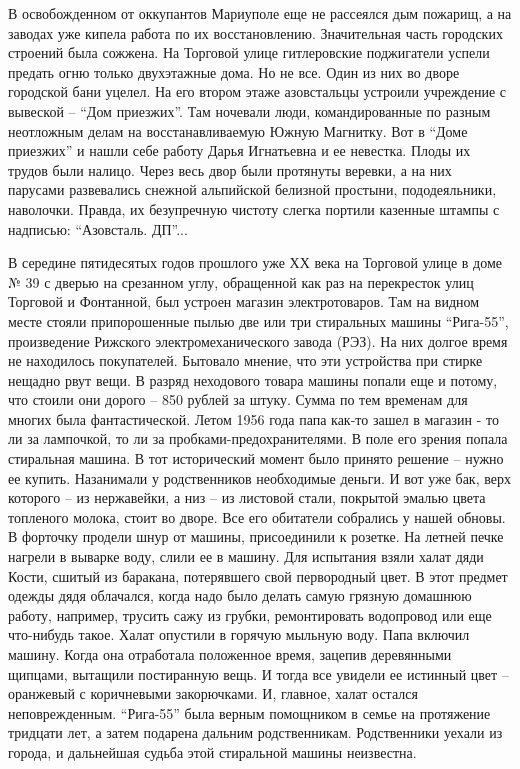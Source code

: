 В освобожденном от оккупантов Мариуполе еще не рассеялся дым пожарищ, а на
заводах уже кипела работа по их восстановлению. Значительная часть городских
строений была сожжена. На Торговой улице гитлеровские поджигатели успели
предать огню только двухэтажные дома. Но не все. Один из них во дворе городской
бани уцелел. На его втором этаже азовстальцы устроили учреждение с вывеской –
\enquote{Дом приезжих}. Там ночевали люди, командированные по разным неотложным делам
на восстанавливаемую Южную Магнитку. Вот в \enquote{Доме приезжих} и нашли себе работу
Дарья Игнатьевна и ее невестка. Плоды их трудов были налицо. Через весь двор
были протянуты веревки, а на них парусами развевались снежной альпийской
белизной простыни, пододеяльники, наволочки. Правда, их безупречную чистоту
слегка портили казенные штампы с надписью: \enquote{Азовсталь. ДП}...

В середине пятидесятых годов прошлого уже ХХ века на Торговой улице в доме № 39
с дверью на срезанном углу, обращенной как раз на перекресток улиц Торговой и
Фонтанной, был устроен магазин электротоваров. Там на видном месте стояли
припорошенные пылью две или три стиральных машины \enquote{Рига-55}, произведение
Рижского электромеханического завода (РЭЗ). На них долгое время не находилось
покупателей. Бытовало мнение, что эти устройства при стирке нещадно рвут вещи.
В разряд неходового товара машины попали еще и потому, что стоили они дорого –
850 рублей за штуку. Сумма по тем временам для многих была фантастической.
Летом 1956 года папа как-то зашел в магазин - то ли за лампочкой, то ли за
пробками-предохранителями. В поле его зрения попала стиральная машина. В тот
исторический момент было принято решение – нужно ее купить. Назанимали у
родственников необходимые деньги. И вот уже бак, верх которого – из нержавейки,
а низ – из листовой стали, покрытой эмалью цвета топленого молока, стоит во
дворе. Все его обитатели собрались у нашей обновы. В форточку продели шнур от
машины, присоединили к розетке. На летней печке нагрели в выварке воду, слили
ее в машину. Для испытания взяли халат дяди Кости, сшитый из баракана,
потерявшего свой первородный цвет. В этот предмет одежды дядя облачался, когда
надо было делать самую грязную домашнюю работу, например, трусить сажу из
грубки, ремонтировать водопровод или еще что-нибудь такое. Халат опустили в
горячую мыльную воду. Папа включил машину. Когда она отработала положенное
время, зацепив деревянными щипцами, вытащили постиранную вещь. И тогда все
увидели ее истинный цвет – оранжевый с коричневыми закорючками. И, главное,
халат остался неповрежденным. \enquote{Рига-55} была верным помощником в семье на
протяжение тридцати лет, а затем подарена дальним родственникам. Родственники
уехали из города, и дальнейшая судьба этой стиральной машины неизвестна.


